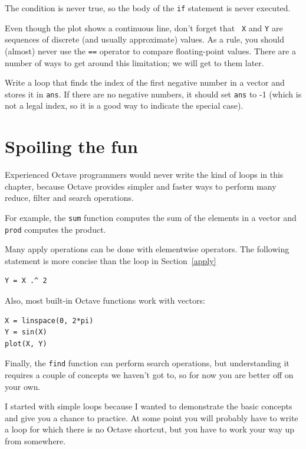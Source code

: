 \documentclass{book}
\begin{document}
The condition is never true, so the body of the {\tt if} statement
is never executed.

Even though the plot shows a continuous line, don't forget that {\tt
X} and {\tt Y} are sequences of discrete (and usually approximate)
values. As a rule, you should (almost) never use the {\tt ==}
operator to compare floating-point values. There are a number of ways
to get around this limitation; we will get to them later.

\begin{ex}
Write a loop that finds the index of the first
negative number in a vector and stores it in {\tt ans}. If there are
no negative numbers, it should set {\tt ans} to -1 (which is not
a legal index, so it is a good way to indicate the special case).
\end{ex}



\section{Spoiling the fun}

Experienced Octave programmers would never write the kind of loops
in this chapter, because Octave provides simpler and faster ways to
perform many reduce, filter and search operations.

For example, the {\tt sum} function computes the sum of the elements
in a vector and {\tt prod} computes the product.

Many apply operations can be done with elementwise operators. The
following statement is more concise than the loop in
Section~\ref{apply}

\begin{verbatim}
Y = X .^ 2
\end{verbatim}

Also, most built-in Octave functions work with vectors:

\begin{verbatim}
X = linspace(0, 2*pi)
Y = sin(X)
plot(X, Y)
\end{verbatim}

Finally, the {\tt find} function can perform search operations, but
understanding it requires a couple of concepts we haven't got to, so
for now you are better off on your own.

I started with simple loops because I wanted to demonstrate the basic
concepts and give you a chance to practice. At some point you will
probably have to write a loop for which there is no 
Octave shortcut, but you have to work your way up from somewhere.
\end{document}
